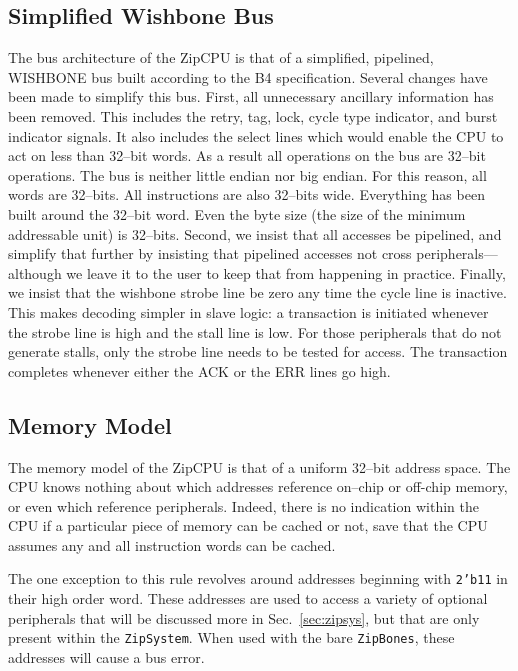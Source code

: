 \documentclass{gqtekspec}
\begin{document}
\subsection{Simplified Wishbone Bus}\label{ssec:bus}
The bus architecture of the ZipCPU is that of a simplified, pipelined, WISHBONE
bus built according to the B4 specification.  Several changes have been made to
simplify this bus.  First, all unnecessary ancillary information has been
removed.  This includes the retry, tag, lock, cycle type indicator, and burst
indicator signals.  It also includes the select lines which would enable the
CPU to act on less than 32--bit words.  As a result all operations on the bus
are 32--bit operations.  The bus is neither little endian nor big endian.  For
this reason, all words are 32--bits.  All instructions are also 32--bits wide. 
Everything has been built around the 32--bit word.  Even the byte size (the
size of the minimum addressable unit) is 32--bits.  Second, we insist that all
accesses be pipelined, and simplify that further by insisting that pipelined
accesses not cross peripherals---although we leave it to the user to keep that
from happening in practice.  Finally, we insist that the wishbone strobe line
be zero any time the cycle line is inactive.  This makes decoding simpler
in slave logic: a transaction is initiated whenever the strobe line is high
and the stall line is low.  For those peripherals that do not generate stalls,
only the strobe line needs to be tested for access.  The transaction completes
whenever either the ACK or the ERR lines go high.

\subsection{Memory Model}\label{ssec:memory}
The memory model of the ZipCPU is that of a uniform 32--bit address space.
The CPU knows nothing about which addresses reference on--chip or off-chip
memory, or even which reference peripherals.  Indeed, there is no indication
within the CPU if a particular piece of memory can be cached or not, save that
the CPU assumes any and all instruction words can be cached.

The one exception to this rule revolves around addresses beginning with
{\tt 2'b11} in their high order word.  These addresses are used to access a
variety of optional peripherals that will be discussed more in
Sec.~\ref{sec:zipsys}, but that are only present within the {\tt ZipSystem}.
When used with the bare {\tt ZipBones}, these addresses will cause a bus error.
\end{document}
